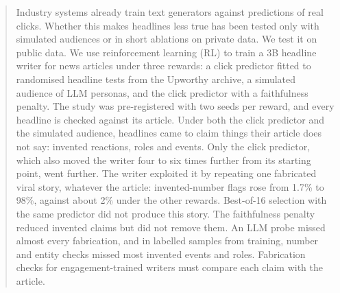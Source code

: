 \begin{abstract}
Industry systems already train text generators against predictions of real clicks. Whether this makes headlines less true has been tested only with simulated audiences or in short ablations on private data. We test it on public data. We use reinforcement learning (RL) to train a 3B headline writer for news articles under three rewards: a click predictor fitted to randomised headline tests from the Upworthy archive, a simulated audience of LLM personas, and the click predictor with a faithfulness penalty. The study was pre-registered with two seeds per reward, and every headline is checked against its article. Under both the click predictor and the simulated audience, headlines came to claim things their article does not say: invented reactions, roles and events. Only the click predictor, which also moved the writer four to six times further from its starting point, went further. The writer exploited it by repeating one fabricated viral story, whatever the article: invented-number flags rose from 1.7\% to 98\%, against about 2\% under the other rewards. Best-of-16 selection with the same predictor did not produce this story. The faithfulness penalty reduced invented claims but did not remove them. An LLM probe missed almost every fabrication, and in labelled samples from training, number and entity checks missed most invented events and roles. Fabrication checks for engagement-trained writers must compare each claim with the article.
\end{abstract}
